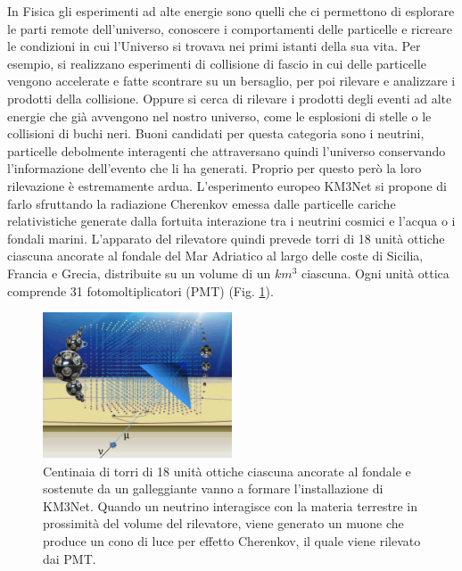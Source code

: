 \documentclass[../main.tex]{subfiles}
\begin{document}
In Fisica gli esperimenti ad alte energie sono quelli che ci permettono di esplorare le parti remote dell'universo, conoscere i comportamenti delle particelle e ricreare le condizioni in cui l'Universo si trovava nei primi istanti della sua vita. Per esempio, si realizzano esperimenti di collisione di fascio in cui delle particelle vengono accelerate e fatte scontrare su un bersaglio, per poi rilevare e analizzare i prodotti della collisione. Oppure si cerca di rilevare i prodotti degli eventi ad alte energie che già avvengono nel nostro universo, come le esplosioni di stelle o le collisioni di buchi neri. Buoni candidati per questa categoria sono i neutrini, particelle debolmente interagenti che attraversano quindi l'universo conservando l'informazione dell'evento che li ha generati. Proprio per questo però la loro rilevazione è estremamente ardua. L'esperimento europeo KM3Net si propone di farlo sfruttando la radiazione Cherenkov emessa dalle particelle cariche relativistiche generate dalla fortuita interazione tra i neutrini cosmici e l'acqua o i fondali marini. L'apparato del rilevatore quindi prevede torri di 18 unità ottiche ciascuna ancorate al fondale del Mar Adriatico al largo delle coste di Sicilia, Francia e Grecia, distribuite su un volume di un $km^3$ ciascuna. Ogni unità ottica comprende 31 fotomoltiplicatori (PMT) (Fig. \ref{fig:towers}). 

\begin{figure}[!b]
    \centering
    \includegraphics[width=0.5\textwidth]{KM3NetTowers.png}
    \caption{\small Centinaia di torri di 18 unità ottiche ciascuna ancorate al fondale e sostenute da un galleggiante vanno a formare l'installazione di KM3Net. Quando un neutrino interagisce con la materia terrestre in prossimità del volume del rilevatore, viene generato un muone che produce un cono di luce per effetto Cherenkov, il quale viene rilevato dai PMT.} \label{fig:towers}
\end{figure}       

    
    
\end{document}
